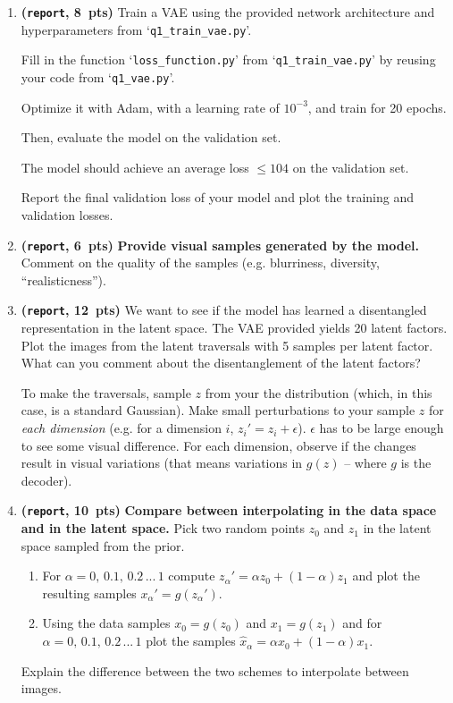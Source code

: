\documentclass[12pt]{article}
\theoremstyle{definition}
\begin{document}
\begin{enumerate}
\item \textbf{(\texttt{report}, 8~pts)}
Train a VAE using the provided network architecture and hyperparameters from `{\tt q1\_train\_vae.py}'. 

Fill in the function `{\tt loss\_function.py}' from `{\tt q1\_train\_vae.py}' by reusing your code from `{\tt q1\_vae.py}'.

Optimize it with Adam, with a learning rate of $10^{-3}$, and train for 20 epochs. 

Then, evaluate the model on the validation set.

The model should achieve an average loss $\leq 104$ on the validation set. 

Report the final validation loss of your model and plot the training and validation losses.

\item \textbf{(\texttt{report}, 6~pts)} \textbf{Provide visual samples generated by the model.}
Comment on the quality of the samples (e.g. blurriness, diversity, ``realisticness''). 

\item \textbf{(\texttt{report}, 12~pts)} 
We want to see if the model has learned a disentangled representation in the latent space.
The VAE provided yields 20 latent factors. Plot the images from the latent traversals with 5 samples per latent factor. What can you comment about the disentanglement of the latent factors?

To make the traversals, sample $z$ from your the distribution (which, in this case, is a standard Gaussian). Make small perturbations to your sample $z$ for \emph{each dimension} (e.g. for a dimension $i$, $z_i' = z_i + \epsilon$). $\epsilon$ has to be large enough to see some visual difference. For each dimension, observe if the changes result in visual variations (that means variations in $g(z)$ -- where $g$ is the decoder). 

\item \textbf{(\texttt{report}, 10~pts)} \textbf{Compare between interpolating in the data space and in the latent space.}
Pick two random points $z_0$ and $z_1$ in the latent space sampled from the prior.     
\begin{enumerate}
    \item For $\alpha = 0,\, 0.1,\, 0.2\, ...\, 1$ compute $z_\alpha'= \alpha z_0 + (1-\alpha) z_1 $ and plot the resulting samples $x_\alpha' = g(z_\alpha')$.
    \item Using the data samples $x_0 = g(z_0)$ and $x_1 = g(z_1)$  and for $\alpha = 0,\, 0.1,\, 0.2\, ...\, 1$  plot the samples $\hat{x}_\alpha = \alpha x_0 + (1-\alpha) x_1 $.
\end{enumerate}
Explain the difference between the two schemes to interpolate between images. 

\end{enumerate}
\end{document}
